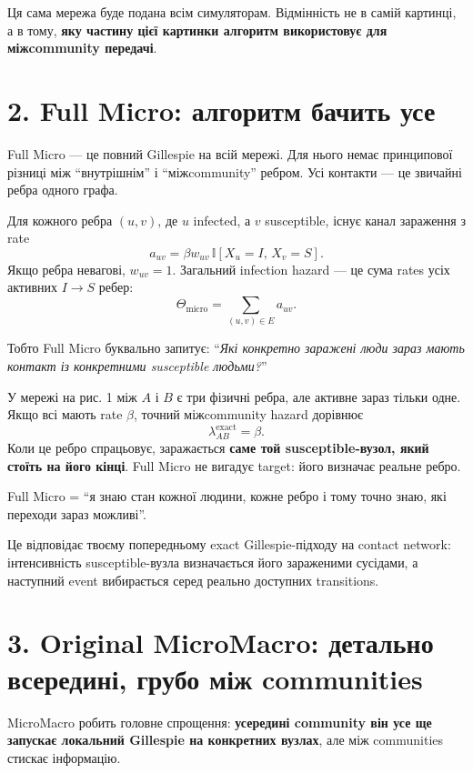 \documentclass[11pt,a4paper]{article}
\newcommand{\I}{\mathbb{I}}
\begin{document}
Ця сама мережа буде подана всім симуляторам. Відмінність не в самій картинці, а в тому, \textbf{яку частину цієї картинки алгоритм використовує для міжcommunity передачі}.

\section*{2. Full Micro: алгоритм бачить усе}

Full Micro --- це повний Gillespie на всій мережі. Для нього немає принципової різниці між ``внутрішнім'' і ``міжcommunity'' ребром. Усі контакти --- це звичайні ребра одного графа.

Для кожного ребра $(u,v)$, де $u$ infected, а $v$ susceptible, існує канал зараження з rate
\[
 a_{uv}=\beta w_{uv}\,\I[X_u=I,\,X_v=S].
\]
Якщо ребра невагові, $w_{uv}=1$. Загальний infection hazard --- це сума rates усіх активних $I\to S$ ребер:
\[
 \Theta_{\text{micro}}=\sum_{(u,v)\in E} a_{uv}.
\]

Тобто Full Micro буквально запитує: ``\textit{Які конкретно заражені люди зараз мають контакт із конкретними susceptible людьми?}''

У мережі на рис. 1 між $A$ і $B$ є три фізичні ребра, але активне зараз тільки одне. Якщо всі мають rate $\beta$, точний міжcommunity hazard дорівнює
\[
 \lambda^{\text{exact}}_{AB}=\beta.
\]
Коли це ребро спрацьовує, заражається \textbf{саме той susceptible-вузол, який стоїть на його кінці}. Full Micro не вигадує target: його визначає реальне ребро.

\begin{tcolorbox}[colback=white,colframe=exact,title=Інтуїція]
Full Micro = ``я знаю стан кожної людини, кожне ребро і тому точно знаю, які переходи зараз можливі''.
\end{tcolorbox}

Це відповідає твоєму попередньому exact Gillespie-підходу на contact network: інтенсивність susceptible-вузла визначається його зараженими сусідами, а наступний event вибирається серед реально доступних transitions.

\section*{3. Original MicroMacro: детально всередині, грубо між communities}

MicroMacro робить головне спрощення: \textbf{усередині community він усе ще запускає локальний Gillespie на конкретних вузлах}, але між communities стискає інформацію.
\end{document}
